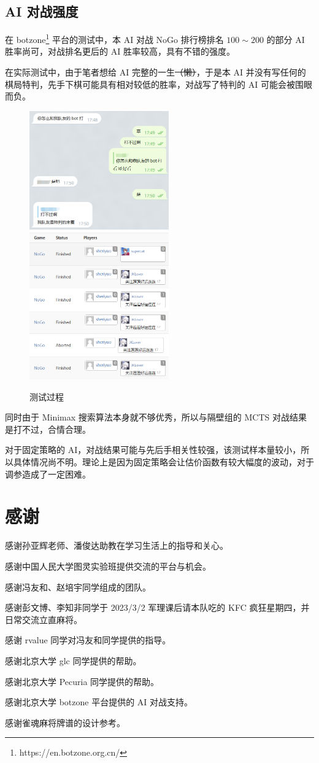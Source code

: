 \documentclass{noithesis}
\begin{document}
	\subsection{AI 对战强度}
	
	在 botzone\footnote{https://en.botzone.org.cn/} 平台的测试中，本 AI 对战 NoGo 排行榜排名 $100\sim 200$ 的部分 AI 胜率尚可，对战排名更后的 AI 胜率较高，具有不错的强度。
	
	在实际测试中，由于笔者想给 AI 完整的一生\sout{（懒）}，于是本 AI 并没有写任何的棋局特判，先手下棋可能具有相对较低的胜率，对战写了特判的 AI 可能会被围眼而负。
	
	\begin{figure}[!htb]
		\centering
		
		\includegraphics[width=6cm]{img/teammate.png}
		\includegraphics[width=6cm]{img/pk.png}
		
		\caption{测试过程}
	\end{figure}
	
	同时由于 Minimax 搜索算法本身就不够优秀，所以与隔壁组的 MCTS 对战结果是打不过，合情合理。
	
	对于固定策略的 AI，对战结果可能与先后手相关性较强，该测试样本量较小，所以具体情况尚不明。理论上是因为固定策略会让估价函数有较大幅度的波动，对于调参造成了一定困难。
		
	\section{感谢}
	
	感谢孙亚辉老师、潘俊达助教在学习生活上的指导和关心。
	
	感谢中国人民大学图灵实验班提供交流的平台与机会。
	
	感谢冯友和、赵培宇同学组成的团队。
	
	感谢彭文博、李知非同学于 2023/3/2 军理课后请本队吃的 KFC 疯狂星期四，并日常交流立直麻将。
	
	感谢 rvalue 同学对冯友和同学提供的指导。
	
	感谢北京大学 glc 同学提供的帮助。
	
	感谢北京大学 Pecuria 同学提供的帮助。
	
	感谢北京大学 botzone 平台提供的 AI 对战支持。
	
	感谢雀魂麻将牌谱的设计参考。
	
\end{document}
